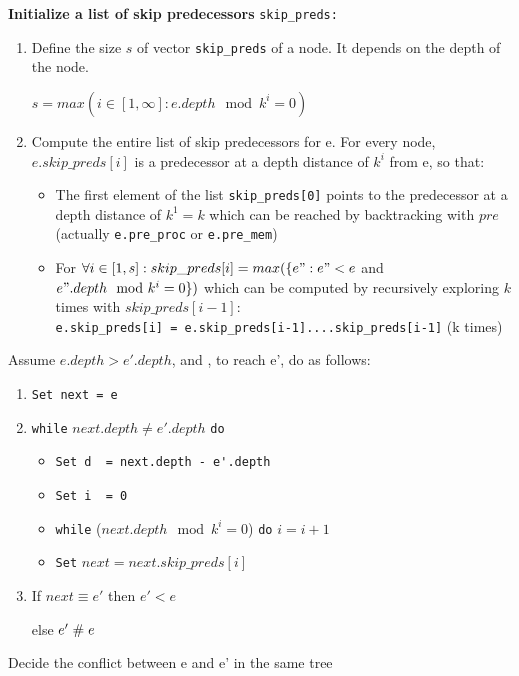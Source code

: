 \documentclass{llncs}
\begin{document}
\noindent
\textbf{Initialize a list of skip predecessors} \verb!skip_preds:!
\begin{enumerate}
\item
	Define the size $s$ of vector \verb!skip_preds! of a node. It depends on the depth of the node.
	
	$s = max(i \in [1,\infty]: e.depth \mod k^{i} = 0 )$ 
\item
	Compute the entire list of skip predecessors for e. For every node, $e.skip\_preds[i]$ is a predecessor at a depth distance of $k^{i}$ from e, so that:
	\begin{itemize}
	\item
		The first element of the list \verb!skip_preds[0]! points to the predecessor at a depth distance of $k^1 = k$ which can be reached by backtracking with $pre$ (actually \verb!e.pre_proc! or \verb!e.pre_mem!)
	\item
		For $\forall i \in [1,s]: skip\_preds[i] = max(\{e": e" < e$ and $e".depth \mod k^i = 0\})$ which can be computed by recursively exploring $k$ times with $skip\_preds[i-1]$: \\
		\verb!e.skip_preds[i] = e.skip_preds[i-1]....skip_preds[i-1]! (k times) 
	\end{itemize}
\end{enumerate}

\begin{algorithm}
	\noindent
	Assume $e.depth > e'.depth$, and , to reach e', do as follows:
	\begin{enumerate}
		\item
		\verb!Set next = e!
		\item
		\verb!while! $next.depth \neq e'.depth$ \verb!do!
		\begin{itemize}
			\item
			\verb!Set d  = next.depth - e'.depth!
			\item
			\verb!Set i  = 0!
			\item
			\verb!while! ($ next.depth \mod k^{i} = 0$)   \space \verb!do!
			$i = i + 1$
			\item
			\verb!Set! $next = next.skip\_preds[i]$ 
		\end{itemize} 
		\item 
		If $next \equiv e'$ then 
		$e'< e$ 
		
		else $e'\mathrel{\#} e$	 
	\end{enumerate}
	\caption{Decide the conflict between e and e' in the same tree}
	\label{a:layer_tree}	
\end{algorithm}
\end{document}
